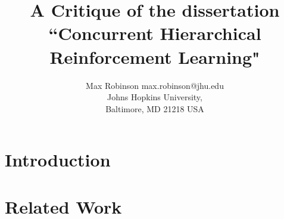 \documentclass[jair,twoside,11pt,theapa]{article}
\begin{document}
\title{A Critique of the dissertation ``Concurrent Hierarchical Reinforcement Learning"}


\author{\name Max Robinson \email max.robinson@jhu.edu \\
       \addr Johns Hopkins University,\\
       Baltimore, MD 21218 USA
   }


\maketitle


\section{Introduction}
\label{Introduction}

\section{Related Work}
\label{relatedwork}


\vskip 0.2in
%

\end{document}
